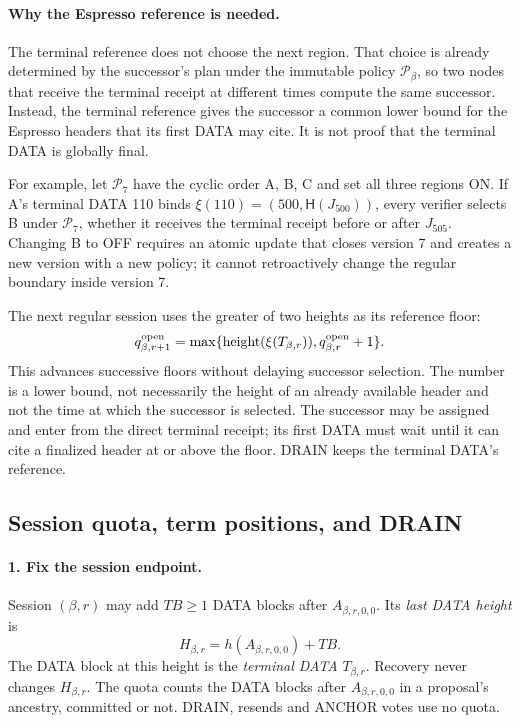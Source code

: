 \documentclass[11pt,a4paper]{article}
\newcommand{\Hash}{\mathsf H}
\newcommand{\TB}{\mathit{TB}}
\newcommand{\defterm}[1]{\textcolor{rrBlue}{\textit{#1}}}
\begin{document}
\paragraph{Why the Espresso reference is needed.}
The terminal reference does not choose the next region. That choice is
already determined by the successor's plan under the immutable policy
$\mathcal P_\beta$, so two nodes that receive the terminal receipt at
different times compute the same successor. Instead, the terminal reference gives the successor a common
lower bound for the Espresso headers that its first DATA may cite. It is
not proof that the terminal DATA is globally final.

For example, let $\mathcal P_7$ have the cyclic order A, B, C and set all
three regions ON. If A's
terminal DATA 110 binds $\xi(110)=(500,\Hash(J_{500}))$, every verifier
selects B under $\mathcal P_7$, whether it receives the terminal receipt
before or after $J_{505}$. Changing B to OFF requires an atomic update
that closes version 7 and creates a new version with a new policy; it
cannot retroactively change the regular boundary inside version 7.

The next regular session uses the greater of two heights as its reference
floor:
\[
 q^{\rm open}_{\beta,r+1}
 =\max\{\operatorname{height}(\xi(T_{\beta,r})),
         q^{\rm open}_{\beta,r}+1\}.
\]
This advances successive floors without delaying successor selection.
The number is a lower bound, not necessarily the height of an already
available header and not the time at which the successor is selected.
The successor may be assigned and enter from the direct terminal receipt;
its first DATA must wait until it can cite a finalized header at or above
the floor. DRAIN keeps the terminal DATA's reference.

\subsection{Session quota, term positions, and DRAIN}
\label{sec:quota}
\paragraph{1. Fix the session endpoint.}
Session $(\beta,r)$ may add $\TB\ge1$ DATA blocks after
$A_{\beta,r,0,0}$. Its \defterm{last DATA height} is
\[
 H_{\beta,r}=h(A_{\beta,r,0,0})+\TB.
\]
The DATA block at this height is the \defterm{terminal DATA}
$T_{\beta,r}$. Recovery never changes $H_{\beta,r}$. The quota counts the
DATA blocks after $A_{\beta,r,0,0}$ in a proposal's ancestry, committed
or not. DRAIN, resends and ANCHOR votes use no quota.
\end{document}
